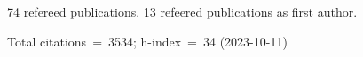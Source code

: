 74 refereed publications. 13 refeered publications as first author.

Total citations~=~3534; h-index~=~34 (2023-10-11)